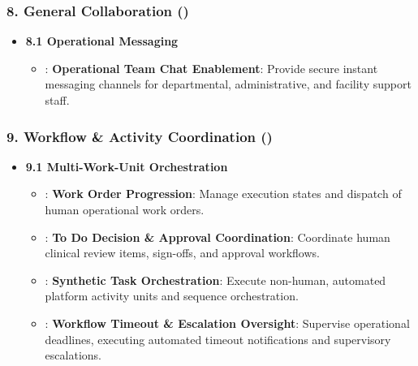 \subsubsection*{8. General Collaboration (\texttt{})}
\label{rad:enabling:648}

\begin{itemize}

\item
\textbf{8.1 Operational Messaging}


\begin{itemize}

\item
\texttt{}: \textbf{Operational Team Chat Enablement}: Provide secure instant messaging channels for departmental, administrative, and facility support staff.



\end{itemize}


\end{itemize}
\label{rad:enabling:651}
\subsubsection*{9. Workflow \& Activity Coordination (\texttt{})}
\label{rad:enabling:652}

\begin{itemize}

\item
\textbf{9.1 Multi-Work-Unit Orchestration}


\begin{itemize}

\item
\texttt{}: \textbf{Work Order Progression}: Manage execution states and dispatch of human operational work orders.



\item
\texttt{}: \textbf{To Do Decision \& Approval Coordination}: Coordinate human clinical review items, sign-offs, and approval workflows.



\item
\texttt{}: \textbf{Synthetic Task Orchestration}: Execute non-human, automated platform activity units and sequence orchestration.



\item
\texttt{}: \textbf{Workflow Timeout \& Escalation Oversight}: Supervise operational deadlines, executing automated timeout notifications and supervisory escalations.



\end{itemize}


\end{itemize}
\label{rad:enabling:658}
